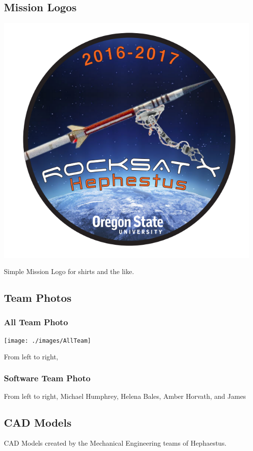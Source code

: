 \subsection{Mission Logos}
\includegraphics[width=\textwidth]{./images/logo}
\begin{center}
Simple Mission Logo for shirts and the like.
\end{center}

\subsection{Team Photos}
\subsubsection{All Team Photo}
\texttt{[image: ./images/AllTeam]}
\begin{center}
From left to right,
\end{center}

\subsubsection{Software Team Photo}
\begin{center}
From left to right, Michael Humphrey, Helena Bales, Amber Horvath, and James
\end{center}

\subsection{CAD Models}
CAD Models created by the Mechanical Engineering teams of Hephaestus.
